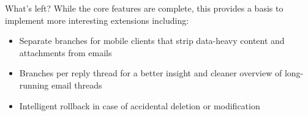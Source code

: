 \documentclass{beamer}
\begin{document}
  \begin{frame}{What's left?}
    While the core features are complete, this provides a basis to implement more interesting extensions including:
    \begin{itemize}
      \item Separate branches for mobile clients that strip data-heavy content and attachments from emails
      \item Branches per reply thread for a better insight and cleaner overview of long-running email threads
      \item Intelligent rollback in case of accidental deletion or modification
    \end{itemize}
  \end{frame}
\end{document}
